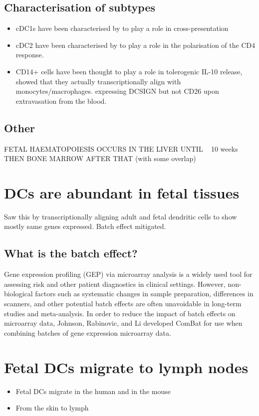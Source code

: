 \documentclass[a4paper]{article}
\begin{document}
\subsection{Characterisation of subtypes}
\begin{itemize}
\item cDC1s have been characterised by \cite{pmid22795876} to play a role in cross-presentation

\item cDC2 have been characterised by \cite{pmid20018619} to play a role in the polarisation of the CD4 response.

\item CD14+ cells have been thought to play a role in tolerogenic IL-10 release, \cite{pmid25200712} showed that they actually transcriptionally align with monocytes/macrophages. expressing DCSIGN but not CD26 upon extravasation from the blood.

\end{itemize}

\subsection{Other}
FETAL HAEMATOPOIESIS OCCURS IN THE LIVER UNTIL ~ 10 weeks THEN BONE MARROW AFTER THAT (with some overlap)

\section{DCs are abundant in fetal tissues}
Saw this by transcriptionally aligning adult and fetal dendritic cells to show mostly same genes expressed. Batch effect mitigated.

\subsection{What is the batch effect?}
Gene expression profiling (GEP) via microarray analysis is a widely used tool for assessing risk and other patient diagnostics in clinical settings. However, non-biological factors such as systematic changes in sample preparation, differences in scanners, and other potential batch effects are often unavoidable in long-term studies and meta-analysis. In order to reduce the impact of batch effects on microarray data, Johnson, Rabinovic, and Li developed ComBat for use when combining batches of gene expression microarray data. \cite{pmid25887219}

\section{Fetal DCs migrate to lymph nodes}
\begin{itemize}
\item Fetal DCs migrate in the human \cite{pmid22795876} and in the mouse \cite{pmid15308107}

\item From the skin to lymph \cite{pmid25200712}
\end{itemize}
\end{document}
